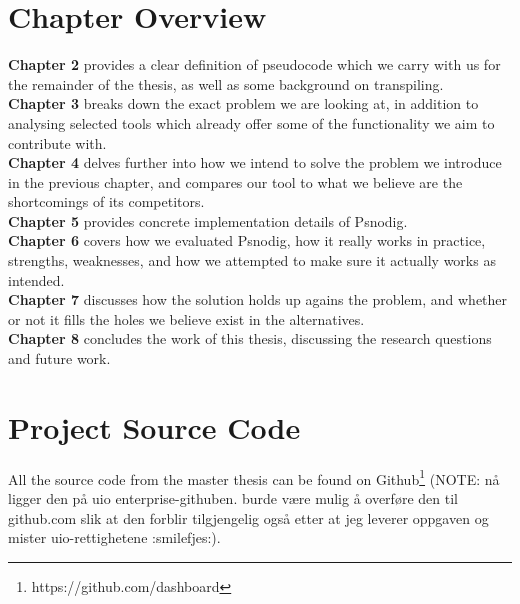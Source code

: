 \section{Chapter Overview}

\textbf{Chapter 2} provides a clear definition of pseudocode which we carry with us for the remainder of the thesis, as well as some background on transpiling. \hfill \\

\textbf{Chapter 3} breaks down the exact problem we are looking at, in addition to analysing selected tools which already offer some of the functionality we aim to contribute with. \hfill \\

\textbf{Chapter 4} delves further into how we intend to solve the problem we introduce in the previous chapter, and compares our tool to what we believe are the shortcomings of its competitors. \hfill \\

\textbf{Chapter 5} provides concrete implementation details of Psnodig. \hfill \\

\textbf{Chapter 6} covers how we evaluated Psnodig, how it really works in practice, strengths, weaknesses, and how we attempted to make sure it actually works as intended. \hfill \\

\textbf{Chapter 7} discusses how the solution holds up agains the problem, and whether or not it fills the holes we believe exist in the alternatives. \hfill \\

\textbf{Chapter 8} concludes the work of this thesis, discussing the research questions and future work.

\section{Project Source Code}

All the source code from the master thesis can be found on Github\footnote{https://github.com/dashboard} (NOTE: nå ligger den på uio enterprise-githuben. burde være mulig å overføre den til github.com slik at den forblir tilgjengelig også etter at jeg leverer oppgaven og mister uio-rettighetene :smilefjes:).